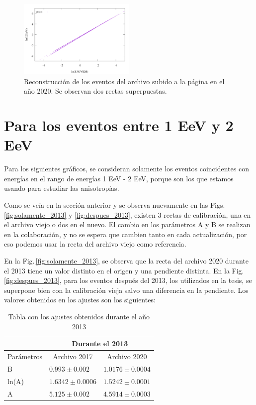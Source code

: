 \begin{figure}[H]
	\centering
	\includegraphics[width=0.5\textwidth]{curva_calibracion_all_2020.png}
	\caption{Reconstrucción de los eventos del archivo subido a la página en el año 2020. Se observan dos rectas superpuestas.}
	\label{fig:2020}
\end{figure}


\section{Para los eventos entre 1 EeV y 2 EeV}

Para los siguientes gráficos, se consideran solamente los eventos coincidentes con energías en el rango de energías 1 EeV - 2 EeV, porque son los que estamos usando para estudiar las anisotropías. 

Como se veía en la sección anterior y se observa nuevamente en las Figs.\,\ref{fig:solamente_2013} y \ref{fig:despues_2013}, existen 3 rectas de calibración, una en el archivo viejo o dos en el nuevo. El cambio en los parámetros A y B se realizan en la colaboración, y no se espera que cambien tanto en cada actualización, por eso podemos usar  la recta del archivo viejo como referencia.

En la Fig.\,\ref{fig:solamente_2013}, se observa que la recta del archivo 2020 durante el 2013 tiene un valor distinto en el origen y una pendiente distinta. En la Fig.\,\ref{fig:despues_2013}, para los eventos después del 2013, los utilizados en la tesis, se superpone bien con la calibración vieja salvo una diferencia en la pendiente. Los valores obtenidos en los ajustes son los siguientes:


\begin{table}[H]
\centering
\begin{tabular}{l|l|l|}
\cline{2-3}
                                 & \multicolumn{2}{c|}{Durante el 2013}                                   \\ \hline
\multicolumn{1}{|l|}{Parámetros} & \multicolumn{1}{c|}{Archivo 2017} & \multicolumn{1}{c|}{Archivo 2020}  \\ \hline
\multicolumn{1}{|l|}{B}          & $0.993 \pm 0.002$                 & $1.0176\pm 0.0004$                 \\ \hline
\multicolumn{1}{|l|}{ln(A)}      & $1.6342 \pm 0.0006$               & $1.5242\pm 0.0001$                 \\ \hline
\multicolumn{1}{|l|}{A}          & $5.125\pm 0.002$                  & $4.5914\pm 0.0003$                 \\ \hline
\end{tabular}
\caption{Tabla con los ajustes obtenidos durante el año 2013}
\end{table}

